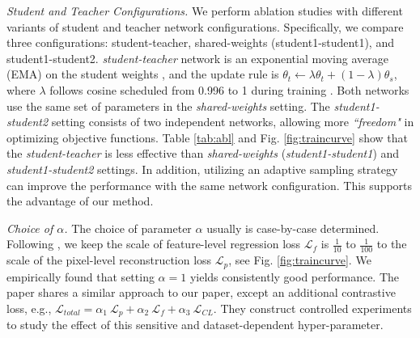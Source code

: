 \documentclass[10pt,twocolumn,letterpaper]{article}
\begin{document}
\textcolor{nblue}{\textit{Student and Teacher Configurations.}}\label{subsec:modelsetting} We perform ablation studies with different variants of student and teacher network configurations. Specifically, we compare three configurations: student-teacher, shared-weights (student1-student1), and student1-student2. \textit{student-teacher} network is an exponential moving average (EMA) on the student weights \cite{moco}, and the update rule is $\theta_t\leftarrow \lambda\theta_t + (1-\lambda)\theta_s$, where $\lambda$ follows cosine scheduled from 0.996 to 1 during training \cite{byol,moco,dino}. Both networks use the same set of parameters in the \textit{shared-weights} setting. The \textit{student1-student2} setting consists of two independent networks, allowing more \textit{``freedom"} in optimizing objective functions. Table \ref{tab:abl} and Fig. \ref{fig:traincurve} show that the \textit{student-teacher} is less effective than \textit{shared-weights} (\textit{student1-student1}) and \textit{student1-student2} settings. In addition, utilizing an adaptive sampling strategy can improve the performance with the same network configuration. This supports the advantage of our method.

\textcolor{nblue}{\textit{Choice of $\alpha$.}} The choice of parameter $\alpha$ usually is case-by-case determined. Following \cite{morency,completer}, we keep the scale of feature-level regression loss $\mathcal L_{f}$ is $\frac{1}{10}$ to $\frac{1}{100}$ to the scale of the pixel-level reconstruction loss $\mathcal L_{p}$, see Fig. \ref{fig:traincurve}. We empirically found that setting $\alpha=1$ yields consistently good performance. The paper \cite{morency} shares a similar approach to our paper, except an additional contrastive loss, e.g., $\mathcal L_{total} = \alpha_1\:\mathcal L_{p} + \alpha_2\:\mathcal L_{f} + \alpha_3\:\mathcal L_{CL}$. They construct controlled experiments to study the effect of this sensitive and dataset-dependent hyper-parameter.
\end{document}
